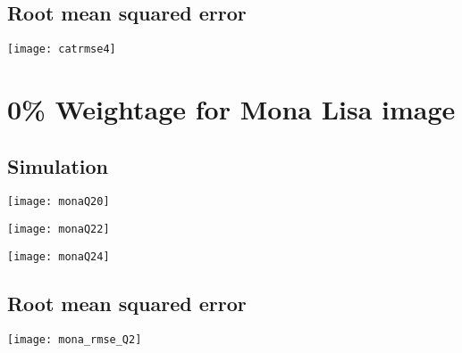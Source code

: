 \documentclass[a4paper, 12pt]{article}
\begin{document}
\subsection{Root mean squared error}

\begin{center}
\begin{minipage}{0.5\linewidth}
    \texttt{[image: catrmse4]}
    \label{fig:Q1_3}
\end{minipage}
\end{center}

\section{0\% Weightage for Mona Lisa image}

\subsection{Simulation}
\begin{center}
\begin{minipage}{0.45\linewidth}
    \texttt{[image: monaQ20]}
    \label{fig:Q1_1}
\end{minipage}
\hfill
\begin{minipage}{0.45\linewidth}
    \texttt{[image: monaQ22]}
    \label{fig:Q1_2}
\end{minipage}
\vspace{1.5 em}

\begin{minipage}{0.45\linewidth}
    \texttt{[image: monaQ24]}
    \label{fig:Q1_2}
\end{minipage}
\vspace{1.5 em}
\end{center}

\subsection{Root mean squared error}

\begin{center}
\begin{minipage}{0.5\linewidth}
    \texttt{[image: mona\_rmse\_Q2]}
    \label{fig:Q1_3}
\end{minipage}
\end{center}
\end{document}
